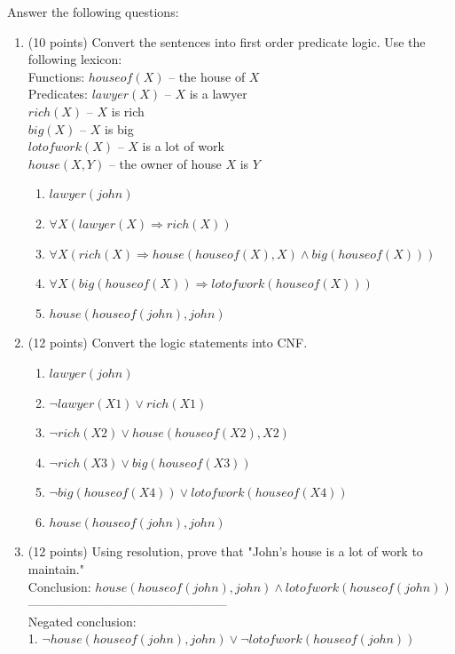 \documentclass{article}%
\begin{document}
\begin{enumerate}
    Answer the following questions:
     \begin{enumerate}
	\item (10 points) Convert the sentences into first order predicate logic. Use the following lexicon: \\
	Functions: $houseof(X)$ -- the house of $X$ \\
	Predicates: $lawyer(X)$ -- $X$ is a lawyer\\
            $rich(X)$ -- $X$ is rich \\
            $big(X)$ -- $X$ is big \\
            $lotofwork(X)$ -- $X$ is a lot of work \\
            $house(X, Y)$ -- the owner of house $X$ is $ Y$\\
        \begin{enumerate}
		\item $ lawyer(john) $
		\item $ \forall X (lawyer(X) \Rightarrow rich(X)) $
		\item $ \forall X (rich(X) \Rightarrow house(houseof(X),X) \wedge big(houseof(X)) ) $
		\item $ \forall X (big(houseof(X)) \Rightarrow lotofwork(houseof(X))) $
		\item $ house(houseof(john),john) $
		\end{enumerate} 
    \item (12 points) Convert the logic statements into CNF.
    	\begin{enumerate}
		\item $ lawyer(john) $
		\item $ \neg lawyer(X1) \vee rich(X1) $
		\item $ \neg rich(X2) \vee house(houseof(X2),X2) $ 
		\item $ \neg rich(X3) \vee big(houseof(X3)) $
		\item $ \neg big(houseof(X4)) \vee lotofwork(houseof(X4)) $
		\item $ house(houseof(john),john) $
		\end{enumerate}
	\item (12 points) Using resolution, prove that "John's house is a lot of work to maintain." \\
	Conclusion: $ house(houseof(john),john) \wedge lotofwork(houseof(john))$\\
		------------------------------------------------\\
		Negated conclusion:  \\
		1. $ \neg house(houseof(john),john) \vee \neg lotofwork(houseof(john))$ \\

\end{enumerate}
\end{enumerate}
\end{document}
